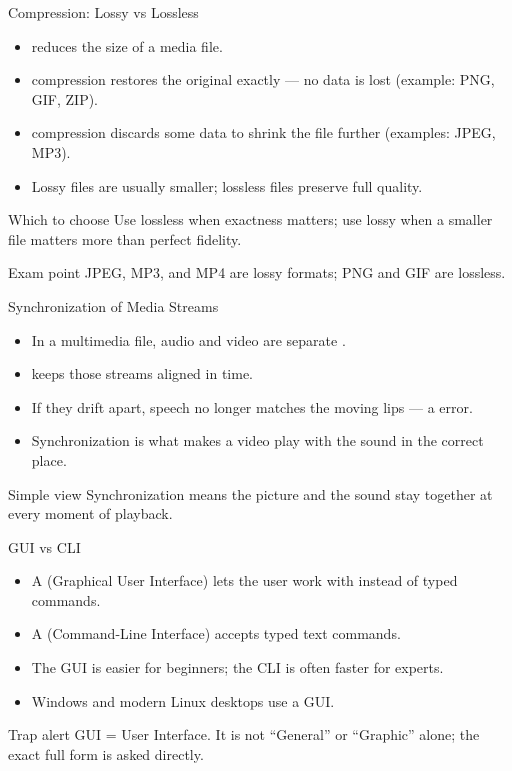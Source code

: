 \documentclass[aspectratio=169]{beamer}
\begin{document}
\begin{frame}{Compression: Lossy vs Lossless}
  \begin{itemize}
    \item {} reduces the size of a media file.
    \item {} compression restores the original exactly --- no data
      is lost (example: PNG, GIF, ZIP).
    \item {} compression discards some data to shrink the file further
      (examples: JPEG, MP3).
    \item Lossy files are usually smaller; lossless files preserve full quality.
  \end{itemize}
  \begin{block}{Which to choose}
    Use lossless when exactness matters; use lossy when a smaller file matters
    more than perfect fidelity.
  \end{block}
  \begin{alertblock}{Exam point}
    JPEG, MP3, and MP4 are lossy formats; PNG and GIF are lossless.
  \end{alertblock}
\end{frame}

\begin{frame}{Synchronization of Media Streams}
  \begin{itemize}
    \item In a multimedia file, audio and video are separate .
    \item {} keeps those streams aligned in time.
    \item If they drift apart, speech no longer matches the moving lips ---
      a  error.
    \item Synchronization is what makes a video play with the sound in the
      correct place.
  \end{itemize}
  \begin{block}{Simple view}
    Synchronization means the picture and the sound stay together at every
    moment of playback.
  \end{block}
\end{frame}

\begin{frame}{GUI vs CLI}
  \begin{itemize}
    \item A  (Graphical User Interface) lets the user work with
       instead of typed commands.
    \item A  (Command-Line Interface) accepts typed text commands.
    \item The GUI is easier for beginners; the CLI is often faster for experts.
    \item Windows and modern Linux desktops use a GUI.
  \end{itemize}
  \begin{alertblock}{Trap alert}
    GUI =  User Interface. It is not ``General'' or ``Graphic''
    alone; the exact full form is asked directly.
  \end{alertblock}
\end{frame}
\end{document}

